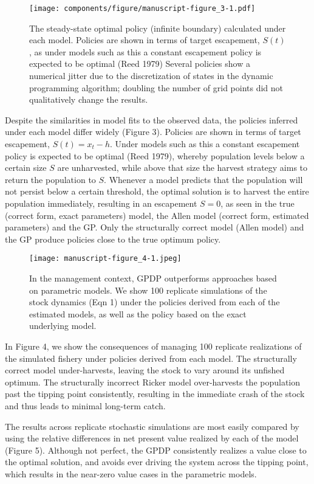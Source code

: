 \documentclass[author-year, 12pt,review]{components/elsarticle} %
\makeatletter
\def\maxwidth{\ifdim\Gin@nat@width>\linewidth\linewidth
\else\Gin@nat@width\fi}
\let\Oldincludegraphics\includegraphics
\renewcommand{\includegraphics}[1]{\Oldincludegraphics[width=\maxwidth]{#1}}
\makeatother
\begin{document}
\begin{figure}[htbp]
\centering
\texttt{[image: components/figure/manuscript-figure\_3-1.pdf]}
\caption{The steady-state optimal policy (infinite boundary) calculated
under each model. Policies are shown in terms of target escapement,
\(S(t)\), as under models such as this a constant escapement policy is
expected to be optimal (Reed 1979) Several policies show a numerical
jitter due to the discretization of states in the dynamic programming
algorithm; doubling the number of grid points did not qualitatively
change the results.}
\end{figure}

Despite the similarities in model fits to the observed data, the
policies inferred under each model differ widely (Figure 3). Policies
are shown in terms of target escapement, \(S(t) = x_t - h\). Under
models such as this a constant escapement policy is expected to be
optimal (Reed 1979), whereby population levels below a certain size
\(S\) are unharvested, while above that size the harvest strategy aims
to return the population to \(S\). Whenever a model predicts that the
population will not persist below a certain threshold, the optimal
solution is to harvest the entire population immediately, resulting in
an escapement \(S=0\), as seen in the true (correct form, exact
parameters) model, the Allen model (correct form, estimated parameters)
and the GP. Only the structurally correct model (Allen model) and the GP
produce policies close to the true optimum policy.

\begin{figure}[htbp]
\centering
\texttt{[image: manuscript-figure\_4-1.jpeg]}
\caption{In the management context, GPDP outperforms approaches based on
parametric models. We show 100 replicate simulations of the stock
dynamics (Eqn 1) under the policies derived from each of the estimated
models, as well as the policy based on the exact underlying model.}
\end{figure}

In Figure 4, we show the consequences of managing 100 replicate
realizations of the simulated fishery under policies derived from each
model. The structurally correct model under-harvests, leaving the stock
to vary around its unfished optimum. The structurally incorrect Ricker
model over-harvests the population past the tipping point consistently,
resulting in the immediate crash of the stock and thus leads to minimal
long-term catch.

The results across replicate stochastic simulations are most easily
compared by using the relative differences in net present value realized
by each of the model (Figure 5). Although not perfect, the GPDP
consistently realizes a value close to the optimal solution, and avoids
ever driving the system across the tipping point, which results in the
near-zero value cases in the parametric models.
\end{document}
